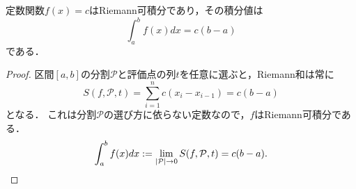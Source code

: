 \begin{example}
    定数関数$f(x) = c$はRiemann可積分であり，その積分値は
    \[ \int_a^b f(x) dx = c(b-a) \]
    である．
\end{example}
\begin{proof}
    区間$[a,b]$の分割$\mathcal{P}$と評価点の列$t$を任意に選ぶと，Riemann和は常に
    \[
    S(f,\mathcal{P},t) = \sum_{i=1}^n c(x_i - x_{i-1}) = c(b-a)
    \]
    となる．
    これは分割$\mathcal{P}$の選び方に依らない定数なので，$f$はRiemann可積分である．
    \[
    \int_a^b f(x)dx := \lim_{|\mathcal P| \to 0} S(f,\mathcal P,t) = c(b-a).
    \]
\end{proof}



